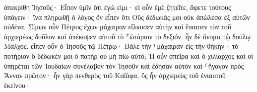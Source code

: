 \documentclass{openreader}
\begin{document}
ἀπεκρίθη Ἰησοῦς· Εἶπον ὑμῖν ὅτι ἐγώ εἰμι· εἰ οὖν ἐμὲ ζητεῖτε, ἄφετε τούτους ὑπάγειν· 
ἵνα πληρωθῇ ὁ λόγος ὃν εἶπεν ὅτι Οὓς δέδωκάς μοι οὐκ ἀπώλεσα ἐξ αὐτῶν οὐδένα. 
Σίμων οὖν Πέτρος ἔχων μάχαιραν εἵλκυσεν αὐτὴν καὶ ἔπαισεν τὸν τοῦ ἀρχιερέως δοῦλον καὶ ἀπέκοψεν αὐτοῦ τὸ ⸀ὠτάριον τὸ δεξιόν. ἦν δὲ ὄνομα τῷ δούλῳ Μάλχος. 
εἶπεν οὖν ὁ Ἰησοῦς τῷ Πέτρῳ· Βάλε τὴν ⸀μάχαιραν εἰς τὴν θήκην· τὸ ποτήριον ὃ δέδωκέν μοι ὁ πατὴρ οὐ μὴ πίω αὐτό; 
Ἡ οὖν σπεῖρα καὶ ὁ χιλίαρχος καὶ οἱ ὑπηρέται τῶν Ἰουδαίων συνέλαβον τὸν Ἰησοῦν καὶ ἔδησαν αὐτὸν 
καὶ ⸀ἤγαγον πρὸς Ἅνναν πρῶτον· ἦν γὰρ πενθερὸς τοῦ Καϊάφα, ὃς ἦν ἀρχιερεὺς τοῦ ἐνιαυτοῦ ἐκείνου· 
\end{document}
